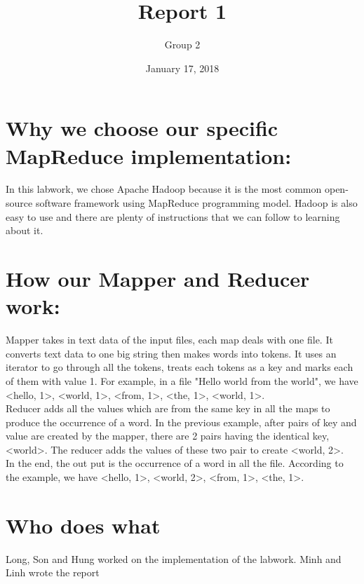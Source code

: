 \documentclass[12pt]{article}
\title{Report 1}
\author{Group 2}
\date{January 17, 2018}
\begin{document}
\maketitle
  \section{Why we choose our specific MapReduce implementation:}
    In this labwork, we chose Apache Hadoop because it is the most common open-source software framework using MapReduce programming model. Hadoop is also easy to use and there are plenty of instructions that we can follow to learning about it. 
  
  \section{How our Mapper and Reducer work:}
    Mapper takes in text data of the input files, each map deals with one file. It converts text data to one big string then makes words into tokens. It uses an iterator to go through all the tokens, treats each tokens as a key and marks each of them with value 1. For example, in a file "Hello world from the world", we have <hello, 1>, <world, 1>, <from, 1>, <the, 1>, <world, 1>.\\
    Reducer adds all the values which are from the same key in all the maps to produce the occurrence of a word. In the previous example, after pairs of key and value are created by the mapper, there are 2 pairs having the identical key, <world>. The reducer adds the values of these two pair to create <world, 2>.\\
    In the end, the out put is the occurrence of a word in all the file. According to the example, we have <hello, 1>, <world, 2>, <from, 1>, <the, 1>.
    
  \section{Who does what}
    Long, Son and Hung worked on the implementation of the labwork. Minh and Linh wrote the report
\end{document}
